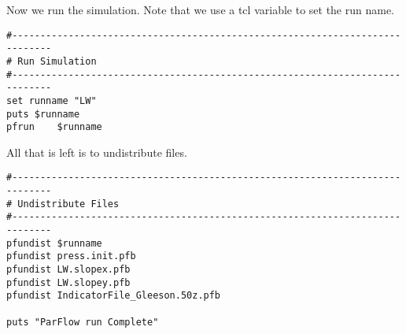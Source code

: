 Now we run the simulation.  Note that we use a tcl variable to set the run name.

\begin{verbatim}
#-----------------------------------------------------------------------------
# Run Simulation
#-----------------------------------------------------------------------------
set runname "LW"
puts $runname
pfrun    $runname
\end{verbatim}

All that is left is to undistribute files.

\begin{verbatim}
#-----------------------------------------------------------------------------
# Undistribute Files
#-----------------------------------------------------------------------------
pfundist $runname
pfundist press.init.pfb
pfundist LW.slopex.pfb
pfundist LW.slopey.pfb
pfundist IndicatorFile_Gleeson.50z.pfb

puts "ParFlow run Complete"
\end{verbatim}



